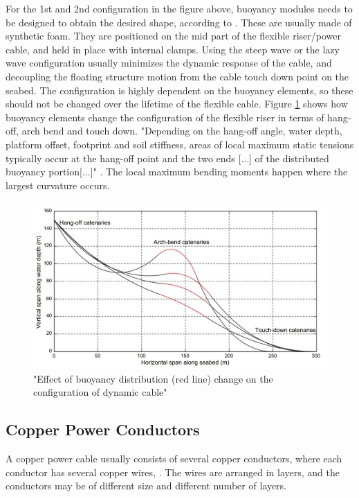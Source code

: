 \noindent For the 1st and 2nd configuration in the figure above, buoyancy modules needs to be designed to obtain the desired shape, according to \cite{srinil2016}. These are usually made of synthetic foam. They are positioned on the mid part of the flexible riser/power cable, and held in place with internal clamps. Using the steep wave or the lazy wave configuration usually minimizes the dynamic response of the cable, and decoupling the floating structure motion from the cable touch down point on the seabed. The configuration is highly dependent on the buoyancy elements, so these should not be changed over the lifetime of the flexible cable. Figure \ref{fig:bend} shows how buoyancy elements change the configuration of the flexible riser in terms of hang-off, arch bend and touch down. "Depending on the hang-off angle, water depth, platform offset, footprint and soil stiffness, areas of local maximum static tensions typically occur at the hang-off point and
the two ends [...] of the distributed buoyancy portion[...]" \cite{srinil2016}. The local maximum bending moments happen where the largest curvature occurs.

\begin{figure}[H]
\centering
\includegraphics[scale=0.6]{figures/bend}
\caption[$\; \:$Effect of buoyancy distribution]{"Effect of buoyancy distribution (red line) change on the configuration of dynamic
cable" \cite{srinil2016}}
 \label{fig:bend}
\end{figure}

\subsection{Copper Power Conductors}
  A copper power cable usually consists of several copper conductors, where each conductor has several copper wires, \cite{Nasution2013}. The wires are arranged in layers, and the conductors may be of different size and different number of layers.
  
